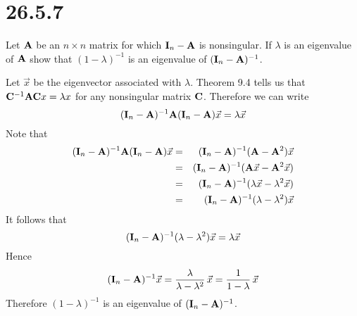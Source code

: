 \section*{26.5.7}
Let $\bf A$ be an $n\times n$ matrix for which ${\bf I}_n-{\bf A}$
is nonsingular.
If $\lambda$ is an eigenvalue of $\bf A$ show that $(1-\lambda)^{-1}$
is an eigenvalue of $({\bf I}_n-{\bf A})^{-1}$.

\bigskip
\noindent
Let $\vec x$ be the eigenvector associated with $\lambda$.
Theorem 9.4 tells us that ${\bf C}^{-1}{\bf AC}x=\lambda x$ for any
nonsingular matrix $\bf C$. Therefore we can write
$$({\bf I}_n-{\bf A})^{-1}{\bf A}({\bf I}_n-{\bf A})\vec x
=\lambda\vec x$$
Note that
\begin{eqnarray*}
({\bf I}_n-{\bf A})^{-1}{\bf A}({\bf I}_n-{\bf A})\vec x
&=&({\bf I}_n-{\bf A})^{-1}({\bf A}-{\bf A}^2)\vec x\\
&=&({\bf I}_n-{\bf A})^{-1}({\bf A}\vec x-{\bf A}^2\vec x)\\
&=&({\bf I}_n-{\bf A})^{-1}(\lambda\vec x-\lambda^2\vec x)\\
&=&({\bf I}_n-{\bf A})^{-1}(\lambda-\lambda^2)\vec x
\end{eqnarray*}
It follows that
$$({\bf I}_n-{\bf A})^{-1}(\lambda-\lambda^2)\vec x=\lambda\vec x$$
Hence
$$({\bf I}_n-{\bf A})^{-1}\vec x
={\lambda\over\lambda-\lambda^2}\,\vec x={1\over1-\lambda}\,\vec x$$
Therefore $(1-\lambda)^{-1}$ is an eigenvalue of
$({\bf I}_n-{\bf A})^{-1}$.
